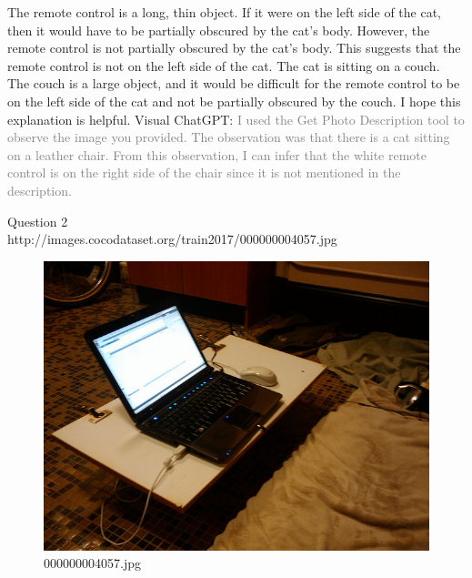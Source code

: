 \begin{enumerate}
        The remote control is a long, thin object. If it were on the left side of the cat, then it would have to be partially obscured by the cat's body. However, the remote control is not partially obscured by the cat's body. This suggests that the remote control is not on the left side of the cat.
        The cat is sitting on a couch. The couch is a large object, and it would be difficult for the remote control to be on the left side of the cat and not be partially obscured by the couch.
        I hope this explanation is helpful.
        \subitem Visual ChatGPT: \textcolor{gray}{I used the Get Photo Description tool to observe the image you provided. The observation was that there is a cat sitting on a leather chair. From this observation, I can infer that the white remote control is on the right side of the chair since it is not mentioned in the description.}
    \end{enumerate}
Question 2\\
http://images.cocodataset.org/train2017/000000004057.jpg
    \begin{figure}[h]
        \centering
        \includegraphics[width=0.8\linewidth]{../image set/easy/000000004057.jpg}
        \caption{000000004057.jpg}
    \end{figure}
